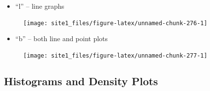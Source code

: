 \documentclass[]{book}
\newenvironment{Shaded}{\begin{snugshade}}{\end{snugshade}}
\newcommand{\CommentTok}[1]{\textcolor[rgb]{0.56,0.35,0.01}{\textit{#1}}}
\newcommand{\DataTypeTok}[1]{\textcolor[rgb]{0.13,0.29,0.53}{#1}}
\newcommand{\KeywordTok}[1]{\textcolor[rgb]{0.13,0.29,0.53}{\textbf{#1}}}
\newcommand{\NormalTok}[1]{#1}
\newcommand{\OperatorTok}[1]{\textcolor[rgb]{0.81,0.36,0.00}{\textbf{#1}}}
\newcommand{\StringTok}[1]{\textcolor[rgb]{0.31,0.60,0.02}{#1}}
\providecommand{\tightlist}{%
  \setlength{\itemsep}{0pt}\setlength{\parskip}{0pt}}
\begin{document}
\begin{itemize}
\tightlist
\item
  ``l'' -- line graphs
\end{itemize}

\begin{Shaded}
\end{Shaded}

\begin{figure}

{\centering \texttt{[image: site1\_files/figure-latex/unnamed-chunk-276-1]} 

}

\caption{ }\label{fig:unnamed-chunk-276}
\end{figure}

\begin{itemize}
\tightlist
\item
  ``b'' -- both line and point plots
\end{itemize}

\begin{Shaded}
\end{Shaded}

\begin{figure}

{\centering \texttt{[image: site1\_files/figure-latex/unnamed-chunk-277-1]} 

}

\caption{ }\label{fig:unnamed-chunk-277}
\end{figure}

\hypertarget{histograms-and-density-plots}{%
\subsection{Histograms and Density Plots}\label{histograms-and-density-plots}}
\end{document}
